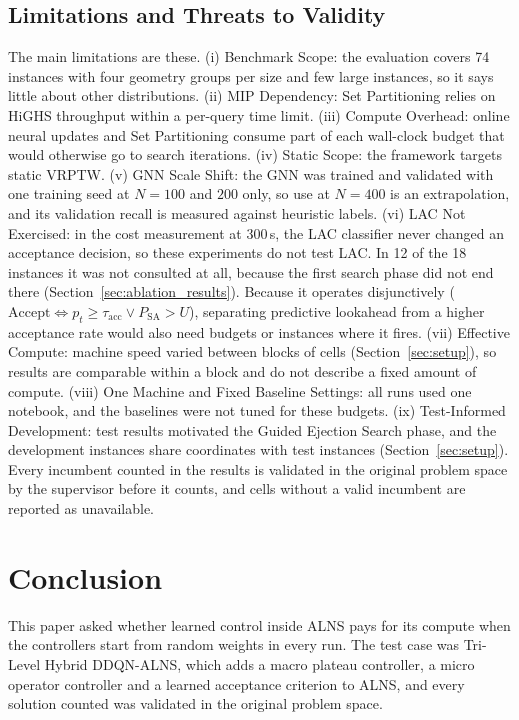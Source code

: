 \documentclass{ieeeaccess}
\begin{document}
\subsection{Limitations and Threats to Validity}
\label{sec:disc_limitations}
The main limitations are these. (i) Benchmark Scope: the evaluation covers 74 instances with four geometry groups per size and few large instances, so it says little about other distributions. (ii) MIP Dependency: Set Partitioning relies on HiGHS throughput within a per-query time limit. (iii) Compute Overhead: online neural updates and Set Partitioning consume part of each wall-clock budget that would otherwise go to search iterations. (iv) Static Scope: the framework targets static VRPTW. (v) GNN Scale Shift: the GNN was trained and validated with one training seed at $N=100$ and $200$ only, so use at $N=400$ is an extrapolation, and its validation recall is measured against heuristic labels. (vi) LAC Not Exercised: in the cost measurement at 300\,s, the LAC classifier never changed an acceptance decision, so these experiments do not test LAC. In 12 of the 18 instances it was not consulted at all, because the first search phase did not end there (Section~\ref{sec:ablation_results}). Because it operates disjunctively ($\text{Accept} \iff p_t \ge \tau_{\text{acc}} \lor P_{\text{SA}} > U$), separating predictive lookahead from a higher acceptance rate would also need budgets or instances where it fires. (vii) Effective Compute: machine speed varied between blocks of cells (Section~\ref{sec:setup}), so results are comparable within a block and do not describe a fixed amount of compute. (viii) One Machine and Fixed Baseline Settings: all runs used one notebook, and the baselines were not tuned for these budgets. (ix) Test-Informed Development: test results motivated the Guided Ejection Search phase, and the development instances share coordinates with test instances (Section~\ref{sec:setup}). Every incumbent counted in the results is validated in the original problem space by the supervisor before it counts, and cells without a valid incumbent are reported as unavailable.

\section{Conclusion}
\label{sec:conclusion}
This paper asked whether learned control inside ALNS pays for its compute when the controllers start from random weights in every run. The test case was Tri-Level Hybrid DDQN-ALNS, which adds a macro plateau controller, a micro operator controller and a learned acceptance criterion to ALNS, and every solution counted was validated in the original problem space.
\end{document}
